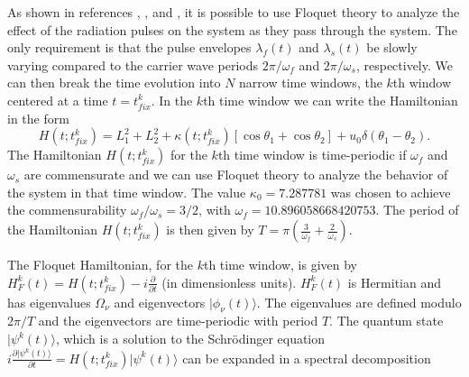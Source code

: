 \documentclass{article}
\begin{document}
As shown in references  \cite{na-reichl:mol-rot}, \cite{holder:reichl:2res},  \cite{roy:reichl:dblwell} and \cite{na-reichl:pbox},  it is possible to use Floquet theory to analyze the effect of the radiation pulses on the system as they pass through the system.  The only requirement is that the pulse envelopes 
${\lambda}_f(t)$ and $ {\lambda}_s(t)$  be slowly varying compared to the carrier wave periods 
$2\pi/{\omega}_f$ and $2\pi/{\omega}_s$,  respectively.  We can then break the time evolution into $N$ narrow time windows, the $k$th window  centered at a time $t=t_{fix}^k$. In the $k$th time window we can write the Hamiltonian in the form
%
\begin{equation}
H(t;t_{fix}^k)=L^2_1 + L^2_2+\kappa(t;t_{fix}^k) [ \cos{{\theta}_1}+ \cos{{\theta}_2}] + u_0 \delta({\theta}_1-{\theta}_2).
\end{equation}
%
The Hamiltonian $H(t;t_{fix}^k)$ for the $k$th time window is time-periodic  if ${\omega}_f$ and ${\omega}_s$ are commensurate and  we can use Floquet theory to analyze the behavior of the system in that time window.  The value $\kappa_0=7.287781$ was chosen to achieve the commensurability $\omega_f/\omega_s = 3/2$, with $\omega_f=10.896058668420753$.  The period of the Hamiltonian $H(t;t_{fix}^k)$ is then given by $T=\pi \left(\frac{3}{\omega_f}+\frac{2}{\omega_s}\right)$. 

The Floquet Hamiltonian, for the $k$th time window, is given by $H_F^k(t)=H(t;t_{fix}^k)-i\frac{\partial}{\partial t}$ (in dimensionless units).  $H_F^k(t)$ is Hermitian and has eigenvalues ${\Omega}_{\nu}$ and eigenvectors $|{\phi}_{\nu}(t){\rangle}$.  The eigenvalues are defined modulo $2\pi/T$ and the eigenvectors   are time-periodic with period $T$.  The quantum state $|{\psi}^k(t){\rangle}$, which is a solution to the Schr\"odinger equation $i\frac{\partial \vert \psi^k(t) \rangle}{\partial t}=H(t;t_{fix}^k)|{\psi}^k(t){\rangle}$ can be expanded in a spectral decomposition 
\end{document}
